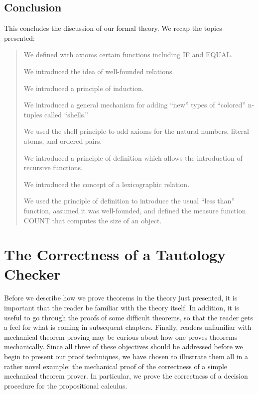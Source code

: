 \documentclass[10pt]{book}
\newenvironment{pubcrown}{\begin{quote}}{\end{quote}}
\begin{document}
\section{Conclusion}
This concludes the discussion of our formal theory.
We recap the topics presented:

\begin{pubcrown}
We defined with axioms certain functions including IF and EQUAL.

We introduced the idea of well-founded relations.

We introduced a principle of induction.

We introduced a general mechanism for adding ``new'' types of
``colored'' n-tuples called ``shells.''

We  used the
shell principle to add axioms for the natural numbers,
literal atoms, and ordered pairs.

We introduced a principle of definition
which allows the introduction of recursive functions.

We introduced the concept of a lexicographic relation.

We used the principle of definition
to introduce the usual ``less than'' function, assumed it was well-founded,
and defined the measure function COUNT that computes the size of an object.
\end{pubcrown}
\chapter{The Correctness of a Tautology Checker}
\pagestyle{headings}
\label{SECTAUTOLOGYCHECKER}
Before we describe how we prove theorems in the theory
just presented, it is important that the reader be familiar
with the theory itself.  In addition, it is useful to go through the proofs of
some difficult theorems, so that the reader gets a feel for what is
coming in subsequent chapters.  Finally, readers unfamiliar
with mechanical theorem-proving may be curious about how one 
proves theorems mechanically.
Since all three of these objectives should be
addressed before we begin to present our proof techniques, we have
chosen to illustrate them all in a rather novel example:
the mechanical proof of the correctness of
a simple mechanical theorem prover.  In particular, we prove the
correctness of a decision procedure for the propositional calculus.
\end{document}

